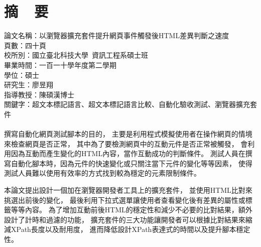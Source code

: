 \chapter*{摘~~要}


\noindent
論文名稱：以瀏覽器擴充套件提升網頁事件觸發後HTML差異判斷之速度\\
頁數：四十頁\\
校所別：國立臺北科技大學~資訊工程系碩士班\\
畢業時間：一百一十學年度第二學期\\
學位：碩士\\
研究生：廖昱翔\\
指導教授：陳碩漢博士\\
\noindent
關鍵字：超文本標記語言、超文本標記語言比較、自動化驗收測試、瀏覽器擴充套件\\
\hspace*{\fill}\\
\indent
撰寫自動化網頁測試腳本的目的，
主要是利用程式模擬使用者在操作網頁的情境來檢查網頁是否正常，
其中為了要檢測網頁中的互動元件是否正常被觸發，
會利用因為互動而產生變化的HTML內容，當作互動成功的判斷條件。
測試人員在撰寫自動化腳本時，因為元件的快速變化或只關注當下元件的變化等等因素，
使得測試人員難以使用有效率的方式找到較為穩定的元素限制條件。

本論文提出設計一個加在瀏覽器開發者工具上的擴充套件，
並使用HTML比對來挑選出前後的變化，
最後利用下拉式選單讓使用者查看變化後有差異的屬性或標籤等等內容。
為了增加互動前後HTML的穩定性和減少不必要的比對結果，額外設計了計時和過濾的功能，
擴充套件的三大功能讓開發者可以根據比對結果來縮減XPath長度以及耐用度，
進而降低設計XPath表達式的時間以及提升腳本穩定性。